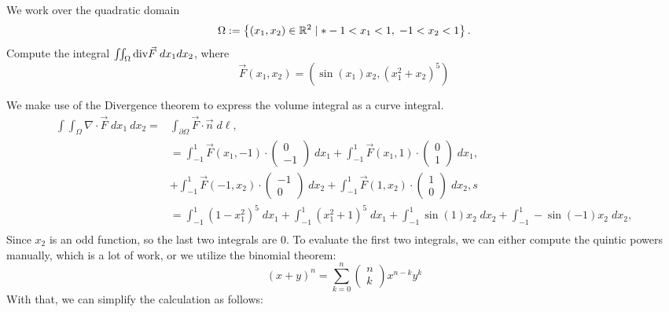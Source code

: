 \documentclass[11pt]{article}
\begin{document}
\begin{exercise}
    We work over the quadratic domain 
    \[
        \Omega := \left\{ (x_1,x_2) \in \bbR^{2} \suchthat* -1 < x_1 < 1, \; -1 < x_2 < 1 \right\}.
    \]
    Compute the integral $\iint_\Omega \mathrm{div} \vec F \;dx_1dx_2$, where 
    \[
        \vec F(x_1,x_2) = \left( \sin(x_1) x_2, \left( x_1^2 + x_2 \right)^5 \right)
    \]
\end{exercise}
\begin{solution}
    We make use of the Divergence theorem to express the volume integral as a curve integral.
    \begin{align*}
        \int \int_{\Omega} \nabla \cdot \vec{F} \;d x_1 \:d x_2 
        =
        &
        \int_{\partial \Omega}\vec{F}\cdot\vec{n} \;d\ell,
        \\&=
        \int_{-1}^1 \vec{F}(x_1,-1)\cdot\begin{pmatrix}0\\-1\end{pmatrix} \;dx_1 + \int_{-1}^1 \vec{F}(x_1,1)\cdot\begin{pmatrix}0\\1\end{pmatrix} \;dx_1,
        \\
        & + \int_{-1}^1 \vec{F}(-1,x_2)\cdot\begin{pmatrix}-1\\0\end{pmatrix} \;dx_2 + \int_{-1}^1 \vec{F}(1,x_2)\cdot\begin{pmatrix}1\\0\end{pmatrix} \;dx_2,s
        \\&=
        \int_{-1}^1 (1-x_1^ 2)^ 5 \;dx_1 + \int_{-1}^1 (x_1^2 + 1)^ 5 \;dx_1 + \int_{-1}^1 \sin(1)x_2\;dx_2 +  \int_{-1}^1 -\sin(-1)x_2\;dx_2,\\
    \end{align*}
    Since $x_2$ is an odd function, so the last two integrals are 0. To evaluate the first two integrals,
    we can either compute the quintic powers manually, which is a lot of work, or we utilize the binomial theorem:
    \[
        (x+y)^n=\sum_{k=0}^n\left(\begin{array}{l}
        n \\
        k
        \end{array}\right) x^{n-k} y^k
    \]
    With that, we can simplify the calculation as follows: 
    \begin{align*}

\end{align*}
\end{solution}
\end{document}
